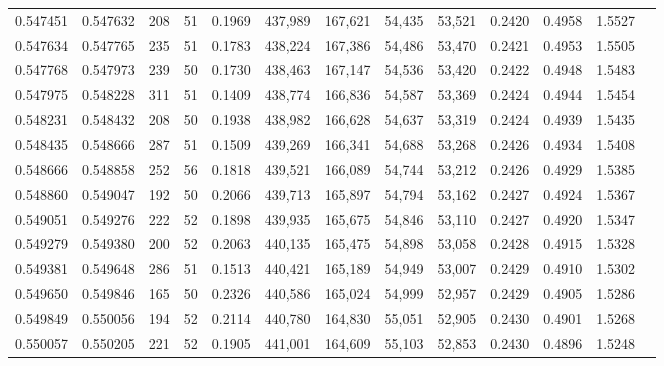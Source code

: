 \begin{tabular}{rrrrrrrrrrrrr}
0.547451 & 0.547632 &   208 &  51 &                                     0.1969 & 437,989 & 167,621 &  54,435 &  53,521 & 0.2420 & 0.4958 & 1.5527 \\
0.547634 & 0.547765 &   235 &  51 &                                     0.1783 & 438,224 & 167,386 &  54,486 &  53,470 & 0.2421 & 0.4953 & 1.5505 \\
0.547768 & 0.547973 &   239 &  50 &                                     0.1730 & 438,463 & 167,147 &  54,536 &  53,420 & 0.2422 & 0.4948 & 1.5483 \\
0.547975 & 0.548228 &   311 &  51 &                                     0.1409 & 438,774 & 166,836 &  54,587 &  53,369 & 0.2424 & 0.4944 & 1.5454 \\
0.548231 & 0.548432 &   208 &  50 &                                     0.1938 & 438,982 & 166,628 &  54,637 &  53,319 & 0.2424 & 0.4939 & 1.5435 \\
0.548435 & 0.548666 &   287 &  51 &                                     0.1509 & 439,269 & 166,341 &  54,688 &  53,268 & 0.2426 & 0.4934 & 1.5408 \\
0.548666 & 0.548858 &   252 &  56 &                                     0.1818 & 439,521 & 166,089 &  54,744 &  53,212 & 0.2426 & 0.4929 & 1.5385 \\
0.548860 & 0.549047 &   192 &  50 &                                     0.2066 & 439,713 & 165,897 &  54,794 &  53,162 & 0.2427 & 0.4924 & 1.5367 \\
0.549051 & 0.549276 &   222 &  52 &                                     0.1898 & 439,935 & 165,675 &  54,846 &  53,110 & 0.2427 & 0.4920 & 1.5347 \\
0.549279 & 0.549380 &   200 &  52 &                                     0.2063 & 440,135 & 165,475 &  54,898 &  53,058 & 0.2428 & 0.4915 & 1.5328 \\
0.549381 & 0.549648 &   286 &  51 &                                     0.1513 & 440,421 & 165,189 &  54,949 &  53,007 & 0.2429 & 0.4910 & 1.5302 \\
0.549650 & 0.549846 &   165 &  50 &                                     0.2326 & 440,586 & 165,024 &  54,999 &  52,957 & 0.2429 & 0.4905 & 1.5286 \\
0.549849 & 0.550056 &   194 &  52 &                                     0.2114 & 440,780 & 164,830 &  55,051 &  52,905 & 0.2430 & 0.4901 & 1.5268 \\
0.550057 & 0.550205 &   221 &  52 &                                     0.1905 & 441,001 & 164,609 &  55,103 &  52,853 & 0.2430 & 0.4896 & 1.5248 \\

\end{tabular}
